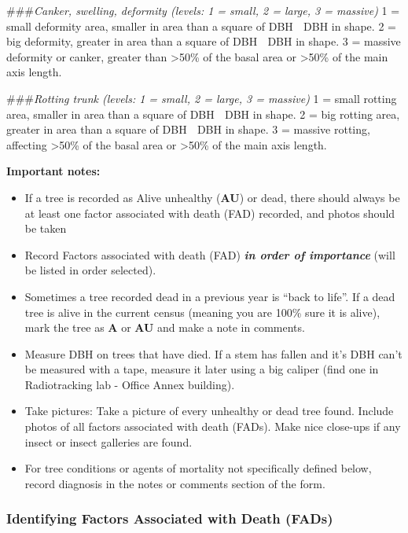 \documentclass[
]{article}
\providecommand{\tightlist}{%
  \setlength{\itemsep}{0pt}\setlength{\parskip}{0pt}}
\begin{document}
\#\#\#\emph{Canker, swelling, deformity (levels: 1 = small, 2 = large, 3
= massive)} 1 = small deformity area, smaller in area than a square of
DBH  DBH in shape. 2 = big deformity, greater in area than a square of
DBH  DBH in shape. 3 = massive deformity or canker, greater than
\textgreater50\% of the basal area or \textgreater50\% of the main axis
length.

\#\#\#\emph{Rotting trunk (levels: 1 = small, 2 = large, 3 = massive)} 1
= small rotting area, smaller in area than a square of DBH  DBH in
shape. 2 = big rotting area, greater in area than a square of DBH  DBH
in shape. 3 = massive rotting, affecting \textgreater50\% of the basal
area or \textgreater50\% of the main axis length.

\textbf{Important notes:}

\begin{itemize}
\tightlist
\item
  If a tree is recorded as Alive unhealthy (\textbf{AU}) or dead, there
  should always be at least one factor associated with death (FAD)
  recorded, and photos should be taken
\item
  Record Factors associated with death (FAD) \textbf{\emph{in order of
  importance}} (will be listed in order selected).
\item
  Sometimes a tree recorded dead in a previous year is ``back to life''.
  If a dead tree is alive in the current census (meaning you are 100\%
  sure it is alive), mark the tree as \textbf{A} or \textbf{AU} and make
  a note in comments.
\item
  Measure DBH on trees that have died. If a stem has fallen and it's DBH
  can't be measured with a tape, measure it later using a big caliper
  (find one in Radiotracking lab - Office Annex building).
\item
  Take pictures: Take a picture of every unhealthy or dead tree found.
  Include photos of all factors associated with death (FADs). Make nice
  close-ups if any insect or insect galleries are found.
\item
  For tree conditions or agents of mortality not specifically defined
  below, record diagnosis in the notes or comments section of the form.
\end{itemize}

\hypertarget{identifying-factors-associated-with-death-fads}{%
\subsubsection{Identifying Factors Associated with Death
(FADs)}\label{identifying-factors-associated-with-death-fads}}
\end{document}
